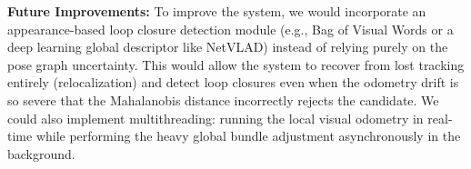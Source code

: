 \documentclass[12pt]{article}
\begin{document}
\textbf{Future Improvements:}
To improve the system, we would incorporate an appearance-based loop closure detection module (e.g., Bag of Visual Words or a deep learning global descriptor like NetVLAD) instead of relying purely on the pose graph uncertainty. This would allow the system to recover from lost tracking entirely (relocalization) and detect loop closures even when the odometry drift is so severe that the Mahalanobis distance incorrectly rejects the candidate. We could also implement multithreading: running the local visual odometry in real-time while performing the heavy global bundle adjustment asynchronously in the background.
\end{document}
